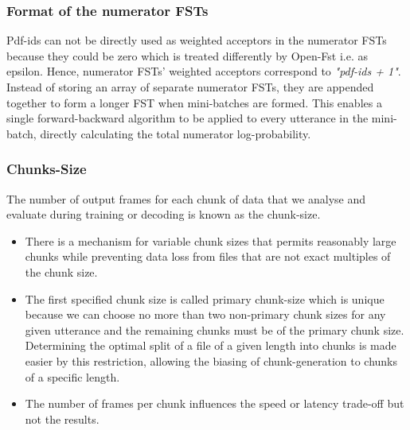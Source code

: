 \subsubsection{Format of the numerator FSTs} 
Pdf-ids can not be directly used as weighted acceptors in the numerator FSTs because they could be zero which is treated differently by Open-Fst i.e. as epsilon. Hence, numerator FSTs' weighted acceptors correspond to \textit{"pdf-ids + 1"}. Instead of storing an array of separate numerator FSTs, they are appended together to form a longer FST when mini-batches are formed. This enables a single forward-backward algorithm to be applied to every utterance in the mini-batch, directly calculating the total numerator log-probability. 

\subsubsection{Chunks-Size} 
The number of output frames for each chunk of data that we analyse and evaluate during training or decoding is known as the chunk-size.
    \begin{itemize}
        \item There is a mechanism for variable chunk sizes that permits reasonably large chunks while preventing data loss from files that are not exact multiples of the chunk size. 
        \item The first specified chunk size is called primary chunk-size which is unique because we can choose no more than two non-primary chunk sizes for any given utterance and the remaining chunks must be of the primary chunk size. Determining the optimal split of a file of a given length into chunks is made easier by this restriction, allowing the biasing of chunk-generation to chunks of a specific length.
        \item The number of frames per chunk influences the speed or latency trade-off but not the results.
    \end{itemize}    

